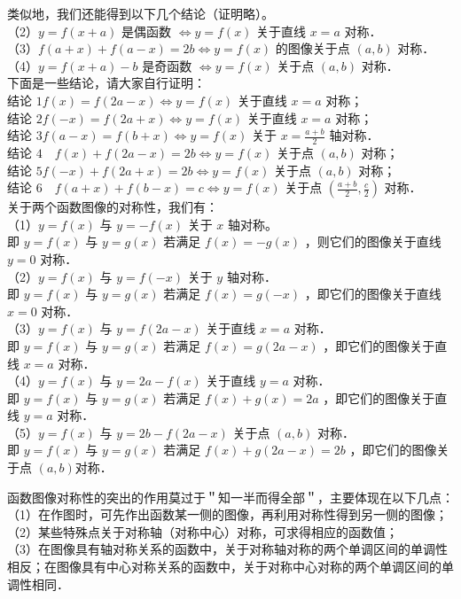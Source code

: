 \documentclass[10pt]{article}
\begin{document}
类似地，我们还能得到以下几个结论（证明略）。\\
（2）\(y=f(x+a)\) 是偶函数 \(\Leftrightarrow y=f(x)\) 关于直线 \(x=a\) 对称．\\
（3）\(f(a+x)+f(a-x)=2 b \Leftrightarrow y=f(x)\) 的图像关于点 \((a, b)\) 对称．\\
（4）\(y=f(x+a)-b\) 是奇函数 \(\Leftrightarrow y=f(x)\) 关于点 \((a, b)\) 对称．\\
下面是一些结论，请大家自行证明：\\
结论 \(1 f(x)=f(2 a-x) \Leftrightarrow y=f(x)\) 关于直线 \(x=a\) 对称；\\
结论 \(2 f(-x)=f(2 a+x) \Leftrightarrow y=f(x)\) 关于直线 \(x=a\) 对称；\\
结论 \(3 f(a-x)=f(b+x) \Leftrightarrow y=f(x)\) 关于 \(x=\frac{a+b}{2}\) 轴对称．\\
结论 \(4 \quad f(x)+f(2 a-x)=2 b \Leftrightarrow y=f(x)\) 关于点 \((a, b)\) 对称；\\
结论 \(5 f(-x)+f(2 a+x)=2 b \Leftrightarrow y=f(x)\) 关于点 \((a, b)\) 对称；\\
结论 \(6 \quad f(a+x)+f(b-x)=c \Leftrightarrow y=f(x)\) 关于点 \(\left(\frac{a+b}{2}, \frac{c}{2}\right)\) 对称．\\
关于两个函数图像的对称性，我们有：\\
（1）\(y=f(x)\) 与 \(y=-f(x)\) 关于 \(x\) 轴对称。\\
即 \(y=f(x)\) 与 \(y=g(x)\) 若满足 \(f(x)=-g(x)\) ，则它们的图像关于直线 \(y=0\) 对称．\\
（2）\(y=f(x)\) 与 \(y=f(-x)\) 关于 \(y\) 轴对称．\\
即 \(y=f(x)\) 与 \(y=g(x)\) 若满足 \(f(x)=g(-x)\) ，即它们的图像关于直线 \(x=0\) 对称．\\
（3）\(y=f(x)\) 与 \(y=f(2 a-x)\) 关于直线 \(x=a\) 对称．\\
即 \(y=f(x)\) 与 \(y=g(x)\) 若满足 \(f(x)=g(2 a-x)\) ，即它们的图像关于直线 \(x=a\) 对称．\\
（4）\(y=f(x)\) 与 \(y=2 a-f(x)\) 关于直线 \(y=a\) 对称．\\
即 \(y=f(x)\) 与 \(y=g(x)\) 若满足 \(f(x)+g(x)=2 a\) ，即它们的图像关于直线 \(y=a\) 对称．\\
（5）\(y=f(x)\) 与 \(y=2 b-f(2 a-x)\) 关于点 \((a, b)\) 对称．\\
即 \(y=f(x)\) 与 \(y=g(x)\) 若满足 \(f(x)+g(2 a-x)=2 b\) ，即它们的图像关于点 \((a, b)\)对称．

函数图像对称性的突出的作用莫过于＂知一半而得全部＂，主要体现在以下几点：\\
（1）在作图时，可先作出函数某一侧的图像，再利用对称性得到另一侧的图像；\\
（2）某些特殊点关于对称轴（对称中心）对称，可求得相应的函数值；\\
（3）在图像具有轴对称关系的函数中，关于对称轴对称的两个单调区间的单调性相反；在图像具有中心对称关系的函数中，关于对称中心对称的两个单调区间的单调性相同．
\end{document}

